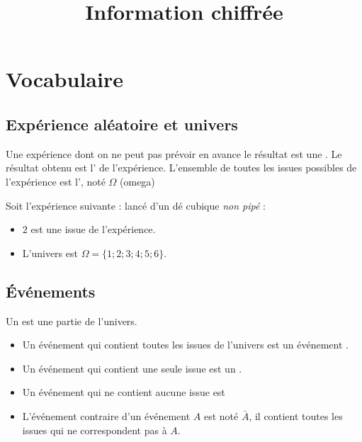 \documentclass[12pt,a4paper]{article}
\date{}
\title{Information chiffrée }
\begin{document}




\section{Vocabulaire}

\subsection{Expérience aléatoire et univers}

\begin{mydefs}
 Une expérience dont on ne peut pas prévoir en avance le résultat est une . Le résultat obtenu est l' de l'expérience. L'ensemble de toutes les issues possibles de l'expérience est l', noté $\Omega$ (omega)
\end{mydefs}

\begin{myex}
	Soit l'expérience suivante : lancé d'un dé cubique \textit{non pipé} :
	\begin{itemize}
		\item $2$ est une issue de l'expérience.
		\item L'univers est $\Omega = \{1 ; 2 ; 3 ; 4 ; 5 ; 6\}$.
	\end{itemize}
\end{myex}

\subsection{\'Evénements}

\begin{mydefs}
	Un  est une partie de l'univers. 
	\begin{itemize}
		\item Un événement qui contient toutes les issues de l'univers est un événement .
		\item Un événement qui contient une seule issue est un .
		\item Un événement qui ne contient aucune issue est 
		\item L'événement contraire d'un événement $A$ est noté $\bar{A}$, il contient toutes les issues qui ne correspondent pas à $A$.
	\end{itemize}
\end{mydefs}
\end{document}
